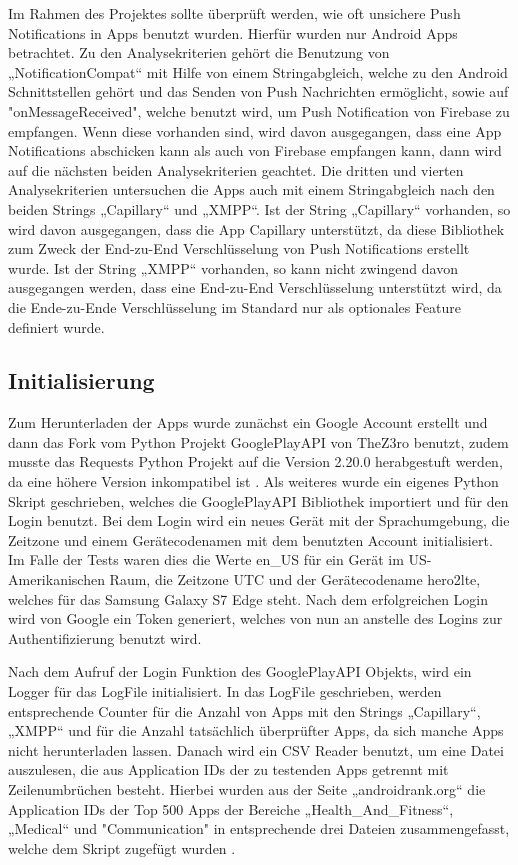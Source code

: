 \documentclass[sigconf]{acmart}
\begin{document}
Im Rahmen des Projektes sollte überprüft werden, wie oft unsichere Push 
Notifications in Apps benutzt wurden. Hierfür wurden nur Android Apps 
betrachtet. Zu den Analysekriterien gehört die Benutzung von 
„NotificationCompat“ mit Hilfe von einem Stringabgleich, welche zu den 
Android Schnittstellen gehört und das Senden von Push Nachrichten ermöglicht, sowie auf "onMessageReceived", welche 
benutzt wird, um Push Notification von Firebase zu empfangen. 
Wenn diese vorhanden sind, wird davon ausgegangen, dass eine App 
Notifications abschicken kann als auch von Firebase empfangen kann, dann wird auf die nächsten beiden 
Analysekriterien geachtet.
Die dritten und vierten Analysekriterien untersuchen die Apps auch mit 
einem Stringabgleich nach den beiden Strings „Capillary“ und „XMPP“. Ist 
der String „Capillary“ vorhanden, so wird davon ausgegangen, dass die App 
Capillary unterstützt, da diese Bibliothek zum Zweck der End-zu-End 
Verschlüsselung von Push Notifications erstellt wurde. Ist der String „XMPP“ 
vorhanden, so kann nicht zwingend davon ausgegangen werden, dass eine 
End-zu-End Verschlüsselung unterstützt wird, da die Ende-zu-Ende 
Verschlüsselung im Standard nur als optionales Feature definiert wurde.

\subsection{Initialisierung}
Zum Herunterladen der Apps wurde zunächst ein Google Account erstellt und dann
das Fork vom Python Projekt GooglePlayAPI 
von TheZ3ro \cite{googleplayapi} benutzt, zudem musste das Requests Python Projekt auf die Version 
2.20.0 herabgestuft werden, da eine höhere Version inkompatibel ist \cite{googleplayapi1}. 
Als weiteres wurde ein eigenes Python Skript geschrieben, welches die 
GooglePlayAPI Bibliothek importiert und für den Login benutzt. Bei dem Login 
wird ein neues Gerät mit der Sprachumgebung, die Zeitzone und einem 
Gerätecodenamen mit dem benutzten Account initialisiert. Im Falle der Tests 
waren dies die Werte en\_US für ein Gerät im US-Amerikanischen Raum, die 
Zeitzone UTC und der Gerätecodename hero2lte, welches für das Samsung 
Galaxy S7 Edge steht. Nach dem erfolgreichen Login wird von Google ein Token generiert, 
welches von nun an anstelle des Logins zur Authentifizierung benutzt wird.

Nach dem Aufruf der Login Funktion des GooglePlayAPI Objekts, 
wird ein Logger für das LogFile initialisiert. In das LogFile geschrieben, werden 
entsprechende Counter für die Anzahl von Apps mit den 
Strings „Capillary“, „XMPP“ und für die Anzahl tatsächlich überprüfter Apps, da sich 
manche Apps nicht herunterladen lassen.
Danach wird ein CSV Reader benutzt, um eine Datei auszulesen, die aus 
Application IDs der zu testenden Apps getrennt mit Zeilenumbrüchen besteht. 
Hierbei wurden aus der Seite „androidrank.org“ die Application IDs der Top 500 
Apps der Bereiche „Health\_And\_Fitness“, „Medical“ und "Communication" in entsprechende 
drei Dateien zusammengefasst, welche dem Skript zugefügt wurden \cite{androidrank}\cite{androidrank1}\cite{androidrank2}.
\end{document}
